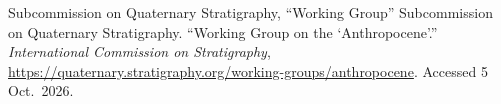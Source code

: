   {Subcommission on Quaternary Stratigraphy, \enquote{Working Group}}
  {Subcommission on Quaternary Stratigraphy. \enquote{Working Group on
   the \enquote{Anthropocene}.} \emph{International Commission on
   Stratigraphy}, \url{https://quaternary.stratigraphy.org/working-groups/anthropocene}.
   Accessed 5 Oct.~2026.}

\newcommand{\imprimirreferencias}{%
  \begingroup\setstretch{1.15}\setlength{\parindent}{0pt}
  \entradaobra{crutzen2002}
  \entradaobra{crutzen-stoermer2000}
  \entradaobra{cunha2017}
  \entradaobra{foucault2013}
  \entradaobra{haraway2015}
  \entradaobra{haraway2016}
  \entradaobra{iugs2024}
  \entradaobra{krenak2022}
  \entradaobra{latour2004}
  \entradaobra{latour1994}
  \entradaobra{latour2020}
  \entradaobra{lewis-maslin2015}
  \entradaobra{malm-hornborg2014}
  \entradaobra{martins2021}
  \entradaobra{mauss2017}
  \entradaobra{ruddiman2003}
  \entradaobra{steffen2015}
  \entradaobra{awg}
  \endgroup}
